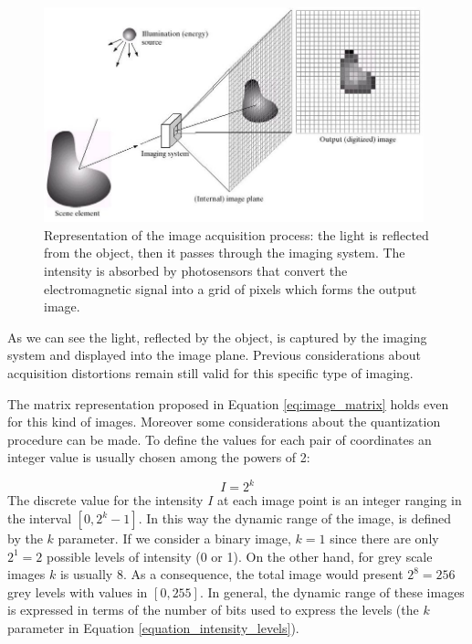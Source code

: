 \documentclass[../main.tex]{subfiles}
\begin{document}
\begin{figure}[H] 
\begin{center}
\includegraphics[width=11cm]{images/Image-Acquisition-Model.png}
\caption{\small{Representation of the image acquisition process: the light is reflected from the object, then it passes through the imaging system. The intensity is absorbed by photosensors that convert the electromagnetic signal into a grid of pixels which forms the output image.\cite{CNN_chapter13}}}\label{fig:Image_acquisition}
\end{center}
\end{figure}

As we can see the light, reflected by the object, is captured by the imaging system and displayed into the image plane. Previous considerations about acquisition distortions remain still valid for this specific type of imaging.


The matrix representation proposed in Equation \ref{eq:image_matrix} holds even for this kind of images. Moreover some considerations about the quantization procedure can be made. 
To define the values for each pair of coordinates an integer value is usually chosen among the powers of 2:

\begin{equation}\label{equation_intensity_levels}
    I = 2^{k}
\end{equation}
The discrete value for the intensity $I$ at each image point is an integer ranging in the interval $[0,2^{k}-1]$. 
In this way the dynamic range of the image, is defined by the $k$ parameter. 
If we consider a binary image, $k=1$ since there are only $2^{1}=2$ possible levels of intensity (0 or 1).
On the other hand, for grey scale images $k$ is usually 8. As a consequence, the total image would present $2^{8}=256$ grey levels with values in $[0,255]$.
In general, the dynamic range of these images is expressed in terms of the number of bits used to express the levels (the $k$ parameter in Equation \ref{equation_intensity_levels}).
\end{document}
